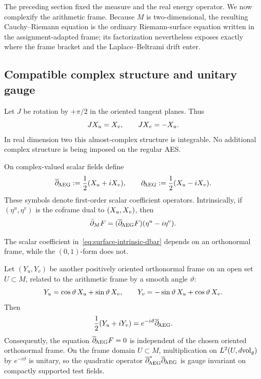 The preceding section fixed the measure and the real energy operator.  We now
complexify the arithmetic frame.  Because $M$ is two-dimensional, the resulting
Cauchy--Riemann equation is the ordinary Riemann-surface equation written in the
assignment-adapted frame; its factorization nevertheless exposes exactly where the
frame bracket and the Laplace--Beltrami drift enter.

\subsection{Compatible complex structure and unitary gauge}

Let $J$ be rotation by $+\pi/2$ in the oriented tangent planes.  Thus
\begin{equation}\label{eq:surface-compatible-complex-structure}
 JX_u=X_v,
 \qquad
 JX_v=-X_u.
\end{equation}
In real dimension two this almost-complex structure is integrable.  No additional
complex structure is being imposed on the regular AES.

\begin{definition}
\label{def:surface-arithmetic-cr-operators}
On complex-valued scalar fields define
\begin{equation}\label{eq:surface-arithmetic-cr-operators}
 \overline\partial_{\!\mathrm{AEG}}:=\frac12(X_u+iX_v),
 \qquad
 \partial_{\!\mathrm{AEG}}:=\frac12(X_u-iX_v).
\end{equation}
These symbols denote first-order scalar coefficient operators.  Intrinsically,
if $(\eta^u,\eta^v)$ is the coframe dual to $(X_u,X_v)$, then
\begin{equation}\label{eq:surface-intrinsic-dbar}
 \bar\partial_MF
 =(\overline\partial_{\!\mathrm{AEG}} F)(\eta^u-i\eta^v).
\end{equation}
\end{definition}

The scalar coefficient in~\eqref{eq:surface-intrinsic-dbar} depends on an
orthonormal frame, while the $(0,1)$-form does not.

\begin{proposition}
\label{prop:surface-u1-gauge}
Let $(Y_u,Y_v)$ be another positively oriented orthonormal frame on an open set
$U\subset M$, related
to the arithmetic frame by a smooth angle $\vartheta$:
\begin{equation}\label{eq:surface-frame-gauge-rotation}
 Y_u=\cos\vartheta\,X_u+\sin\vartheta\,X_v,
 \qquad
 Y_v=-\sin\vartheta\,X_u+\cos\vartheta\,X_v.
\end{equation}
Then
\begin{equation}\label{eq:surface-cr-gauge-law}
 \frac12(Y_u+iY_v)=e^{-i\vartheta}\overline\partial_{\!\mathrm{AEG}}.
\end{equation}
Consequently, the equation $\overline\partial_{\!\mathrm{AEG}} F=0$ is independent of the chosen
oriented orthonormal frame.  On the frame domain $U\subset M$, multiplication on
$L^2(U,d\mathrm{vol}_g)$ by
$e^{-i\vartheta}$ is unitary, so the quadratic operator
$\overline\partial_{\!\mathrm{AEG}}^*\overline\partial_{\!\mathrm{AEG}}$ is gauge invariant on compactly supported test fields.
\end{proposition}

